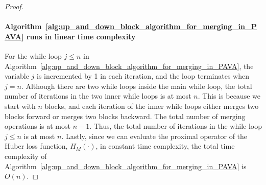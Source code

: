 \begin{proof}
\paragraph{Algorithm~\ref{alg:up_and_down_block_algorithm_for_merging_in_PAVA} runs in linear time complexity}
For the while loop $j \leq n$ in Algorithm~\ref{alg:up_and_down_block_algorithm_for_merging_in_PAVA}, the variable $j$ is incremented by 1 in each iteration, and the loop terminates when $j = n$.
Although there are two while loops inside the main while loop, the total number of iterations in the two inner while loops is at most $n$.
This is because we start with $n$ blocks, and each iteration of the inner while loops either merges two blocks forward or merges two blocks backward.
The total number of merging operations is at most $n-1$.
Thus, the total number of iterations in the while loop $j \leq n$ is at most $n$.
Lastly, since we can evaluate the proximal operator of the Huber loss function, $H_M(\cdot)$, in constant time complexity, the total time complexity of Algorithm~\ref{alg:up_and_down_block_algorithm_for_merging_in_PAVA} is $O(n)$.


\end{proof}

